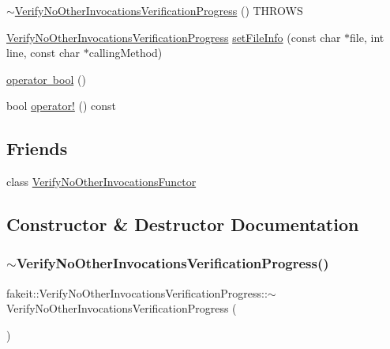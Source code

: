 \begin{DoxyCompactItemize}
\item 
\mbox{\hyperlink{classfakeit_1_1VerifyNoOtherInvocationsVerificationProgress_a772030e95159eefd02781fb3ea7724cd}{$\sim$\+Verify\+No\+Other\+Invocations\+Verification\+Progress}} () T\+H\+R\+O\+WS
\item 
\mbox{\hyperlink{classfakeit_1_1VerifyNoOtherInvocationsVerificationProgress}{Verify\+No\+Other\+Invocations\+Verification\+Progress}} \mbox{\hyperlink{classfakeit_1_1VerifyNoOtherInvocationsVerificationProgress_a7f7eed982a12383ca4254831cf4d223b}{set\+File\+Info}} (const char $\ast$file, int line, const char $\ast$calling\+Method)
\item 
\mbox{\hyperlink{classfakeit_1_1VerifyNoOtherInvocationsVerificationProgress_a0c43a3d8783d9dae9d963190a6a41b47}{operator bool}} ()
\item 
bool \mbox{\hyperlink{classfakeit_1_1VerifyNoOtherInvocationsVerificationProgress_a61e25bc85da74b9eceae47fcca1dec4f}{operator!}} () const
\end{DoxyCompactItemize}
\subsection*{Friends}
\begin{DoxyCompactItemize}
\item 
class \mbox{\hyperlink{classfakeit_1_1VerifyNoOtherInvocationsVerificationProgress_a6ce32529327b50289b74216a4a9a421c}{Verify\+No\+Other\+Invocations\+Functor}}
\end{DoxyCompactItemize}


\subsection{Constructor \& Destructor Documentation}
\mbox{\label{classfakeit_1_1VerifyNoOtherInvocationsVerificationProgress_a772030e95159eefd02781fb3ea7724cd}} 
\subsubsection{\texorpdfstring{$\sim$VerifyNoOtherInvocationsVerificationProgress()}{~VerifyNoOtherInvocationsVerificationProgress()}\hspace{0.1cm}{\footnotesize\ttfamily [1/9]}}
{\footnotesize\ttfamily fakeit\+::\+Verify\+No\+Other\+Invocations\+Verification\+Progress\+::$\sim$\+Verify\+No\+Other\+Invocations\+Verification\+Progress (\begin{DoxyParamCaption}{ }\end{DoxyParamCaption})\hspace{0.3cm}{\ttfamily [inline]}}


